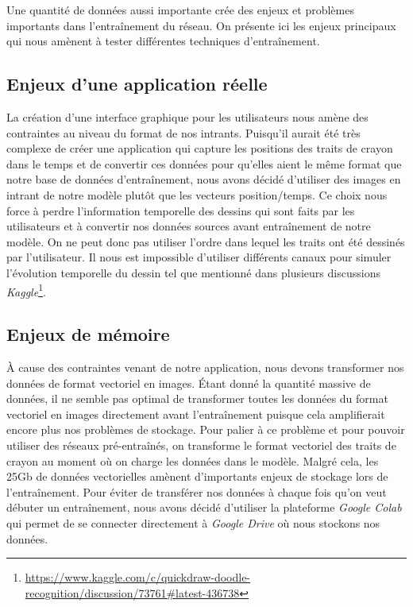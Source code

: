 Une quantité de données aussi importante crée des enjeux et problèmes importants dans l'entraînement du réseau. On présente ici les enjeux principaux qui nous amènent à tester différentes techniques d'entraînement.

\subsection{Enjeux d'une application réelle}

La création d'une interface graphique pour les utilisateurs nous amène des contraintes au niveau du format de nos intrants.
Puisqu'il aurait été très complexe de créer une application qui capture les positions des traits de crayon dans le temps et de convertir ces données pour qu'elles aient le même format que notre base de données d'entraînement, nous avons décidé d'utiliser des images en intrant de notre modèle plutôt que les vecteurs position/temps.
Ce choix nous force à perdre l'information temporelle des dessins qui sont faits par les utilisateurs et à convertir nos données sources avant entraînement de notre modèle.
On ne peut donc pas utiliser l'ordre dans lequel les traits ont été dessinés par l'utilisateur. 
Il nous est impossible d'utiliser différents canaux pour simuler l'évolution temporelle du dessin tel que mentionné dans plusieurs discussions \emph{Kaggle}\footnote{\url{https://www.kaggle.com/c/quickdraw-doodle-recognition/discussion/73761#latest-436738}}.

\subsection{Enjeux de mémoire}

À cause des contraintes venant de notre application, nous devons transformer nos données de format vectoriel en images. 
Étant donné la quantité massive de données, il ne semble pas optimal de transformer toutes les données du format vectoriel en images directement avant l'entraînement puisque cela amplifierait encore plus nos problèmes de stockage.
Pour palier à ce problème et pour pouvoir utiliser des réseaux pré-entraînés, on transforme le format vectoriel des traits de crayon au moment où on charge les données dans le modèle.
Malgré cela, les 25Gb de données vectorielles amènent d'importants enjeux de stockage lors de l'entraînement.
Pour éviter de transférer nos données à chaque fois qu'on veut débuter un entraînement, nous avons décidé d'utiliser la plateforme \emph{Google Colab} qui permet de se connecter directement à \emph{Google Drive} où nous stockons nos données.

